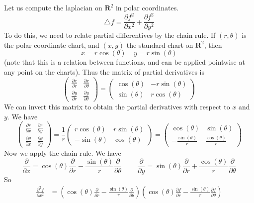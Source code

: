 \begin{example}
    Let us compute the laplacian on $\mathbf{R}^2$ in polar coordinates.
    \[ \bigtriangleup f = \frac{\partial f^2}{\partial x^2} + \frac{\partial f^2}{\partial y^2} \]
    To do this, we need to relate partial differentives by the chain rule. If $(r,\theta)$ is the polar coordinate chart, and $(x,y)$ the standard chart on $\mathbf{R}^2$, then
    \[ x = r \cos(\theta)\ \ \ \ \ y = r \sin(\theta) \]
    (note that this is a relation between functions, and can be applied pointwise at any point on the charts). Thus the matrix of partial derivatives is
    \[ \begin{pmatrix} \frac{\partial x}{\partial r} & \frac{\partial x}{\partial \theta} \\ \frac{\partial y}{\partial r} & \frac{\partial y}{\partial \theta} \end{pmatrix} = \begin{pmatrix} \cos(\theta) & -r \sin(\theta) \\ \sin(\theta) & r \cos(\theta) \end{pmatrix} \]
    We can invert this matrix to obtain the partial derivatives with respect to $x$ and $y$. We have
    \[ \begin{pmatrix} \frac{\partial r}{\partial x} & \frac{\partial r}{\partial y} \\ \frac{\partial \theta}{\partial x} & \frac{\partial \theta}{\partial y} \end{pmatrix} = \frac{1}{r} \begin{pmatrix} r \cos(\theta) & r \sin(\theta) \\ -\sin(\theta) & \cos(\theta) \end{pmatrix} = \begin{pmatrix} \cos(\theta) & \sin(\theta) \\ -\frac{\sin(\theta)}{r} & \frac{\cos(\theta)}{r} \end{pmatrix} \]
    Now we apply the chain rule. We have
    \[ \frac{\partial}{\partial x} = \cos(\theta) \frac{\partial}{\partial r} - \frac{\sin(\theta)}{r} \frac{\partial}{\partial \theta}\ \ \ \ \ \ \ \ \ \ \frac{\partial}{\partial y} = \sin(\theta) \frac{\partial}{\partial r} + \frac{\cos(\theta)}{r} \frac{\partial}{\partial \theta} \]
    So
    \begin{align*}
        \frac{\partial^2 f}{\partial x^2} &= \left( \cos(\theta) \frac{\partial}{\partial r} - \frac{\sin(\theta)}{r} \frac{\partial}{\partial \theta} \right) \left( \cos(\theta) \frac{\partial f}{\partial r} - \frac{\sin(\theta)}{r} \frac{\partial f}{\partial \theta} \right)\\

\end{align*}
\end{example}
